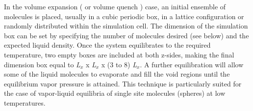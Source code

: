 \documentclass[9pt,bestpractices]{livecoms}
\begin{document}
In the volume expansion ( or volume quench \citep{holcomb1993} ) case,
an initial ensemble of molecules is placed,  usually in a cubic periodic box,
in a lattice configuration or randomly distributed within the simulation cell.
The dimension of the simulation box can be set by specifying the number of
molecules desired (see below) and the expected liquid density. Once the system
equilibrates to the required temperature, two empty boxes are included at both
z-sides, making the final dimension box equal to \textit{L}$_{x}$
x \textit{L}$_{x}$ x (3 to 8) \textit{L}$_{x}$.  A further equilibration will
allow some of the liquid molecules to evaporate and fill the void regions until
the equilibrium vapor pressure is attained. This technique is particularly
suited for the case of vapor-liquid equilibria of single site molecules
(spheres) at low temperatures. 
\end{document}
